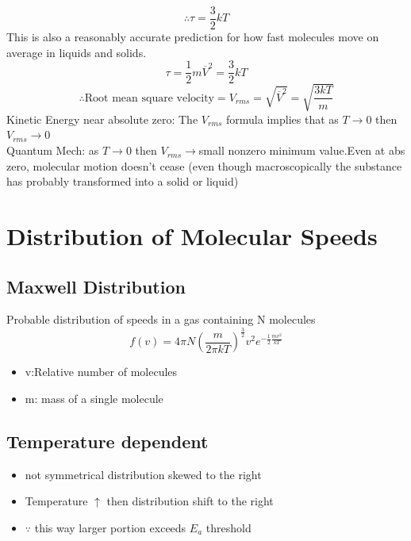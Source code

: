 \documentclass[12 pt, twoside, a4paper] {article}
\begin{document}
\begin{equation}
\therefore  \tau=\frac{3}{2}kT
\end{equation}
This is also a reasonably accurate prediction for how fast molecules move on average in liquids and solids.
$$\tau=\frac{1}{2} m \overline{V}^2 =\frac{3}{2}kT$$
\begin{equation}
\therefore \text{Root mean square velocity}= V_{rms}=\sqrt{\overline{V}^2}=\sqrt{\frac{3kT}{m}}
\end{equation}
Kinetic Energy near absolute zero:
The $V_{rms}$ formula implies that as $T \rightarrow 0$ then $V_{rms} \rightarrow 0$
\\Quantum Mech: as $T \rightarrow 0$ then $V_{rms} \rightarrow $small nonzero minimum value.Even at abs zero, molecular motion doesn't cease (even though macroscopically the substance has  probably transformed into a solid or liquid)
\section{Distribution of Molecular Speeds}
\subsection{Maxwell Distribution}
Probable distribution of speeds in a gas containing N molecules
\begin{equation}
f(v)= 4\pi N (\frac{m}{2 \pi k T})^{\frac{3}{2}} v^2 e^{-\frac{1}{2}\frac{mv^2}{kT}}
\end{equation}
\begin{itemize}
\item v:Relative number of molecules
\item m: mass of a single molecule
\end{itemize}
\subsection{Temperature dependent}
\begin{itemize}
\item not symmetrical distribution skewed to the right
\item Temperature $\uparrow$ then distribution shift to the right
\item $\because$ this way larger portion exceeds $E_a$ threshold
\end{itemize}
\end{document}
